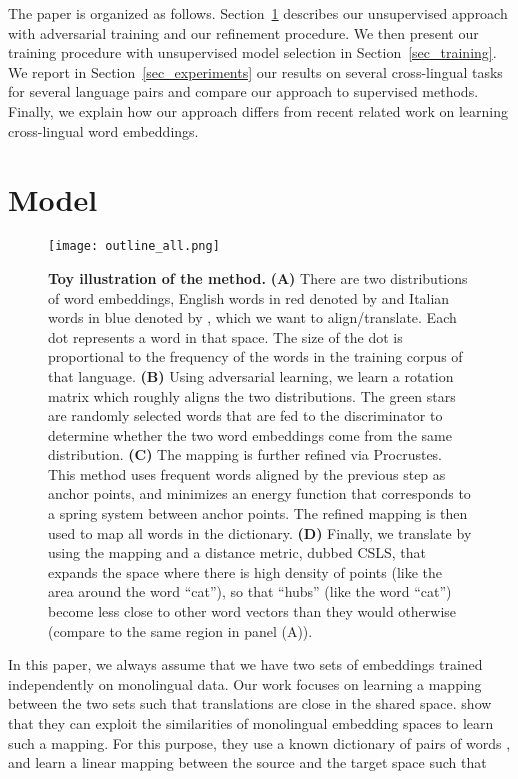 \documentclass{article} \usepackage{iclr2018_conference,times}
\newcommand{\hub}{CSLS\xspace}
\begin{document}
The paper is organized as follows. Section~\ref{sec_model} describes our unsupervised approach with adversarial training and our refinement procedure. We then present our training procedure with unsupervised model selection in Section~\ref{sec_training}. We report in Section~\ref{sec_experiments} our results on several cross-lingual tasks for several language pairs and compare our approach to supervised methods. Finally, we explain how our approach differs from recent related work on learning cross-lingual word embeddings.
 \def\source{\textrm{source}}
\def\target{\textrm{target}}
\def\fro{\mathrm{F}}

\section{Model}
\label{sec_model}

\begin{figure}
  \begin{center}
  \texttt{[image: outline\_all.png]}
\end{center}
  \caption{\textbf{Toy illustration of the method.} \textbf{(A)} There are two distributions of word embeddings, English words in red denoted by  and Italian words in blue denoted by , which we want to align/translate. Each dot represents a word in that
  space. The size of the dot is proportional to the frequency of the words in the training corpus of that language. \textbf{(B)} Using adversarial learning, we learn a rotation matrix  which roughly aligns the two distributions. The green stars are randomly selected words that are fed to the discriminator to determine whether the two word embeddings come from the same distribution. \textbf{(C)} The mapping  is further refined via Procrustes.
  This method uses frequent words aligned by the previous step as anchor points, and minimizes an energy function that corresponds to a spring system between anchor points. The refined mapping is then used to map all words in the dictionary. \textbf{(D)} Finally, we translate by using the mapping  and a distance metric, dubbed \hub, that expands the space where there is high density of points (like the area around the word ``cat''), so that ``hubs'' (like the word ``cat'') become less close to other word vectors than they would otherwise (compare to the same region in panel (A)).
  \label{figure:outline}}
  \vspace{-5pt}
\end{figure}


In this paper, we always assume that we have two sets of embeddings trained independently on monolingual data. Our work focuses on learning a mapping between the two sets such that translations are close in the shared space.
\cite{mikolov2013exploiting} show that they can exploit the similarities of monolingual embedding spaces to learn such a  mapping. For this purpose, they use a known dictionary of  pairs of words , and learn a linear mapping  between the source and the target space such that
\end{document}

